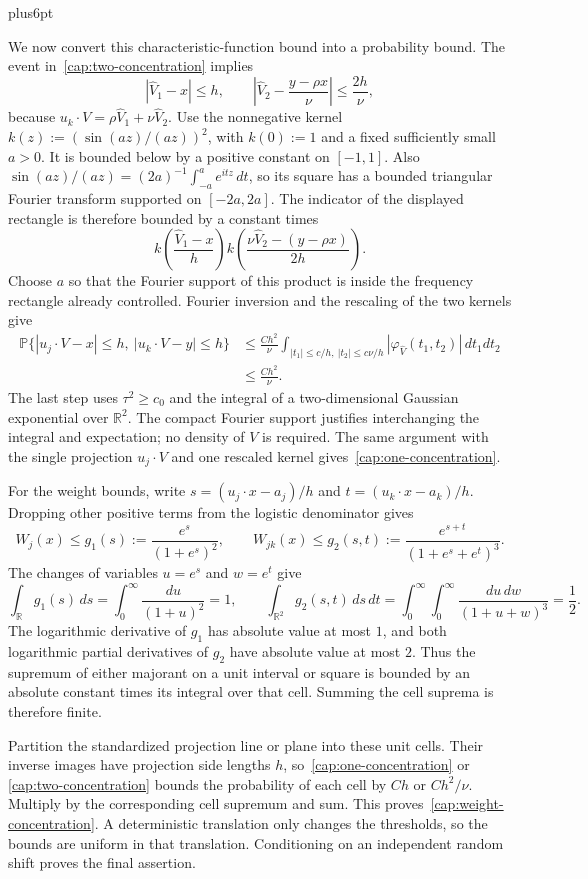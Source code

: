 \documentclass[11pt,letterpaper,twoside,leqno]{article}
\makeatletter
\theoremstyle{bookplain}
\theoremstyle{bookremark}
\renewenvironment{proof}[1][\proofname]{\par
  \pushQED{\qed}\normalfont\topsep6pt plus6pt\relax
  \trivlist\item[\hskip\labelsep\bfseries #1\@addpunct{.}]\ignorespaces
}{\popQED\endtrivlist\@endpefalse}
\newcommand{\Pp}{\mathbb P}
\newcommand{\R}{\mathbb R}
\makeatother
\begin{document}
\begin{proof}
We now convert this characteristic-function bound into a
probability bound. The event in~\eqref{cap:two-concentration}
implies
\[
 |\widehat V_1-x|\le h,\qquad
 \left|\widehat V_2-\frac{y-\rho x}{\nu}\right|
 \le\frac{2h}{\nu},
\]
because $u_k\cdot V=\rho\widehat V_1+\nu\widehat V_2$.
Use the nonnegative kernel
$k(z):=(\sin(az)/(az))^2$, with $k(0):=1$ and a fixed
sufficiently small $a>0$. It is bounded below by a positive
constant on $[-1,1]$. Also
$\sin(az)/(az)=(2a)^{-1}\int_{-a}^a e^{itz}\,dt$,
so its square has a bounded triangular Fourier transform
supported on $[-2a,2a]$.
The indicator of the displayed rectangle is therefore bounded
by a constant times
\[
 k\left(\frac{\widehat V_1-x}{h}\right)
 k\left(\frac{\nu\widehat V_2-(y-\rho x)}{2h}\right).
\]
Choose $a$ so that the Fourier support of this product is
inside the frequency rectangle already controlled. Fourier
inversion and the rescaling of the two kernels give
\[
 \begin{split}
 \Pp\{|u_j\cdot V-x|\le h,\ |u_k\cdot V-y|\le h\}
 &\le\frac{Ch^2}{\nu}
   \int_{|t_1|\le c/h,\ |t_2|\le c\nu/h}
       |\varphi_{\widehat V}(t_1,t_2)|\,dt_1dt_2\\
 &\le\frac{Ch^2}{\nu}.
 \end{split}
\]
The last step uses $\tau^2\ge c_0$ and the integral of a
two-dimensional Gaussian exponential over $\R^2$.
The compact Fourier support justifies interchanging the integral
and expectation; no density of $V$ is required. The same argument
with the single projection $u_j\cdot V$ and one rescaled kernel
gives~\eqref{cap:one-concentration}.

For the weight bounds, write
$s=(u_j\cdot x-a_j)/h$ and $t=(u_k\cdot x-a_k)/h$.
Dropping other positive terms from the logistic denominator gives
\[
 W_j(x)\le g_1(s):=\frac{e^s}{(1+e^s)^2},\qquad
 W_{jk}(x)\le g_2(s,t):=
                 \frac{e^{s+t}}{(1+e^s+e^t)^3}.
\]
The changes of variables $u=e^s$ and $w=e^t$ give
\[
 \int_{\R}g_1(s)\,ds=\int_0^\infty\frac{du}{(1+u)^2}=1,
 \qquad
 \int_{\R^2}g_2(s,t)\,ds\,dt
 =\int_0^\infty\int_0^\infty\frac{du\,dw}{(1+u+w)^3}
 =\frac12.
\]
The logarithmic derivative of $g_1$ has absolute value at most
$1$, and both logarithmic partial derivatives of $g_2$ have
absolute value at most $2$. Thus the supremum of either
majorant on a unit interval or square is bounded by an absolute
constant times its integral over that cell. Summing the cell
suprema is therefore finite.

Partition the standardized projection line or plane into these
unit cells. Their inverse images have projection side lengths
$h$, so~\eqref{cap:one-concentration} or
\eqref{cap:two-concentration} bounds the probability of each cell
by $Ch$ or $Ch^2/\nu$. Multiply by the corresponding cell
supremum and sum. This proves~\eqref{cap:weight-concentration}.
A deterministic translation only changes the thresholds, so the
bounds are uniform in that translation. Conditioning on an
independent random shift proves the final assertion.
\end{proof}
\end{document}

